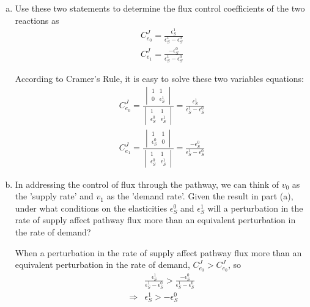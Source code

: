 \documentclass[paper=a4, fontsize=11pt]{scrartcl} %
\numberwithin{equation}{section} %
\numberwithin{figure}{section} %
\numberwithin{table}{section} %
\begin{document}
	\begin{enumerate}[a)]
		\item Use these two statements to determine the flux control coefficients of the two reactions as
		\begin{align*}
			C_{e_0}^J=\frac{\epsilon_S^1}{\epsilon_S^1-\epsilon_S^0}\\
			C_{e_1}^J=\frac{-\epsilon_S^0}{\epsilon_S^1-\epsilon_S^0}
		\end{align*}

		According to Cramer's Rule, it is easy to solve these two variables equations:
		\begin{align*}
			C_{e_0}^J=\frac{
				\begin{vmatrix}
					1 & 1  \\
   					0 & \epsilon_S^1
				\end{vmatrix}
			}{
				\begin{vmatrix}
					1 & 1  \\
   					\epsilon_S^0 & \epsilon_S^1
				\end{vmatrix}
			}=\frac{\epsilon_S^1}{\epsilon_S^1-\epsilon_S^0}\\
			C_{e_1}^J=\frac{
				\begin{vmatrix}
					1 & 1  \\
   					\epsilon_S^0 & 0
				\end{vmatrix}
			}{
				\begin{vmatrix}
					1 & 1  \\
   					\epsilon_S^0 & \epsilon_S^1
				\end{vmatrix}
			}=\frac{-\epsilon_S^0}{\epsilon_S^1-\epsilon_S^0}
		\end{align*}

		\item In addressing the control of flux through the pathway, we can think of $v_0$ as the 'supply rate' and $v_1$ as the 'demand rate'. Given the result in part (a), under what conditions on the elasticities $\epsilon_S^0$ and $\epsilon_S^1$ will a perturbation in the rate of supply affect pathway flux more than an equivalent perturbation in the rate of demand?

		When a perturbation in the rate of supply affect pathway flux more than an equivalent perturbation in the rate of demand, $C_{e_0}^J>C_{e_0}^J$, so
		\begin{align*}
		&\frac{\epsilon_S^1}{\epsilon_S^1-\epsilon_S^0} > \frac{-\epsilon_S^0}{\epsilon_S^1-\epsilon_S^0} \\
		\Rightarrow &\epsilon_S^1 >-\epsilon_S^0
		\end{align*}


\end{enumerate}
\end{document}
